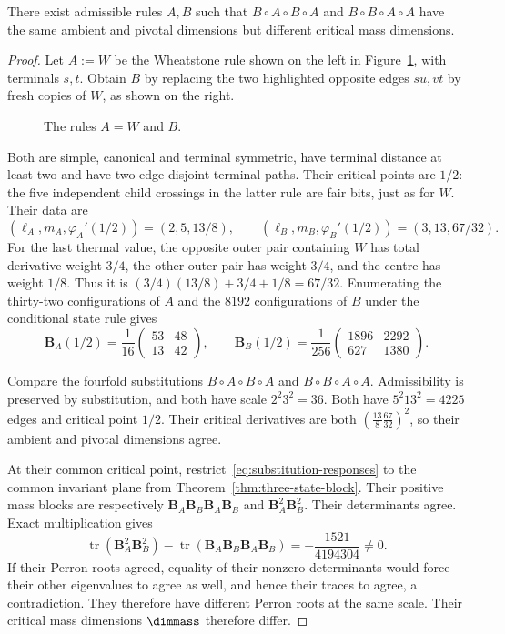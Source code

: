 \begin{lemma}\label{lem:permutation-obstruction}
There exist admissible rules $A,B$ such that $B\circ A\circ B\circ A$ and $B\circ B\circ A\circ A$ have the same ambient and pivotal dimensions but different critical mass dimensions.
\end{lemma}
\begin{proof}
Let $A:=W$ be the Wheatstone rule shown on the left in Figure~\ref{fig:wheatstone-permutation-rules}, with terminals $s,t$.
Obtain $B$ by replacing the two highlighted opposite edges $su,vt$ by fresh copies of $W$, as shown on the right.
\begin{figure}[tbp]
\centering

\caption{The rules $A=W$ and $B$.}
\label{fig:wheatstone-permutation-rules}
\end{figure}
Both are simple, canonical and terminal symmetric, have terminal distance at least two and have two edge-disjoint terminal paths. Their critical points are $1/2$: the five independent child crossings in the latter rule are fair bits, just as for $W$. Their data are
\[
 (\ell_A,m_A,\varphi_A'(1/2))=(2,5,13/8),\qquad
 (\ell_B,m_B,\varphi_B'(1/2))=(3,13,67/32).
\]
For the last thermal value, the opposite outer pair containing $W$ has total derivative weight $3/4$, the other outer pair has weight $3/4$, and the centre has weight $1/8$. Thus it is $(3/4)(13/8)+3/4+1/8=67/32$.
Enumerating the thirty-two configurations of $A$ and the $8192$ configurations of $B$ under the conditional state rule gives
\[
 \mathbf B_A(1/2)=\frac1{16}\begin{pmatrix}53&48\\13&42\end{pmatrix},
 \qquad
 \mathbf B_B(1/2)=\frac1{256}\begin{pmatrix}1896&2292\\627&1380\end{pmatrix}.
\]

Compare the fourfold substitutions $B\circ A\circ B\circ A$ and $B\circ B\circ A\circ A$. Admissibility is preserved by substitution, and both have scale $2^2 3^2=36$. Both have $5^2 13^2=4225$ edges and critical point $1/2$.
Their critical derivatives are both $(\frac{13}{8}\frac{67}{32})^2$, so their ambient and pivotal dimensions agree.

At their common critical point, restrict~\eqref{eq:substitution-responses} to the common invariant plane from Theorem~\ref{thm:three-state-block}.
Their positive mass blocks are respectively $\mathbf B_A\mathbf B_B\mathbf B_A\mathbf B_B$ and $\mathbf B_A^2\mathbf B_B^2$. Their determinants agree. Exact multiplication gives
\[
 \operatorname{tr}(\mathbf B_A^2\mathbf B_B^2)
 -\operatorname{tr}(\mathbf B_A\mathbf B_B\mathbf B_A\mathbf B_B)
 =-\frac{1521}{4194304}\ne0.
\]
If their Perron roots agreed, equality of their nonzero determinants would force their other eigenvalues to agree as well, and hence their traces to agree, a contradiction. They therefore have different Perron roots at the same scale. Their critical mass dimensions $\dimmass$ therefore differ.
\end{proof}


